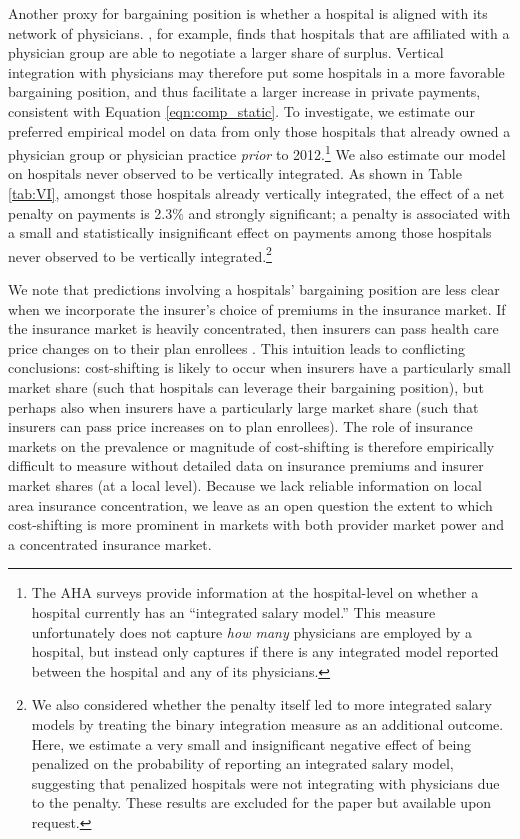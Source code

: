 \documentclass[12pt]{article}
\begin{document}
Another proxy for bargaining position is whether a hospital is aligned with its network of physicians. \cite{lewis2015}, for example, finds that hospitals that are affiliated with a physician group are able to negotiate a larger share of surplus. Vertical integration with physicians may therefore put some hospitals in a more favorable bargaining position, and thus facilitate a larger increase in private payments, consistent with Equation \ref{eqn:comp_static}. To investigate, we estimate our preferred empirical model on data from only those hospitals that already owned a physician group or physician practice \textit{prior} to 2012.\footnote{The AHA surveys provide information at the hospital-level on whether a hospital currently has an ``integrated salary model.'' This measure unfortunately does not capture \textit{how many} physicians are employed by a hospital, but instead only captures if there is any integrated model reported between the hospital and any of its physicians.} We also estimate our model on hospitals never observed to be vertically integrated.  As shown in Table \ref{tab:VI}, amongst those hospitals already vertically integrated, the effect of a net penalty on payments is 2.3$\%$ and strongly significant; a penalty is associated with a small and statistically insignificant effect on payments among those hospitals never observed to be vertically integrated.\footnote{We also considered whether the penalty itself led to more integrated salary models by treating the binary integration measure as an additional outcome. Here, we estimate a very small and insignificant negative effect of being penalized on the probability of reporting an integrated salary model, suggesting that penalized hospitals were not integrating with physicians due to the penalty. These results are excluded for the paper but available upon request.}

We note that predictions involving a hospitals' bargaining position are less clear when we incorporate the insurer's choice of premiums in the insurance market. If the insurance market is heavily concentrated, then insurers can pass health care price changes on to their plan enrollees \citep{trish2015,ho2017}. This intuition leads to conflicting conclusions: cost-shifting is likely to occur when insurers have a particularly small market share (such that hospitals can leverage their bargaining position), but perhaps also when insurers have a particularly large market share (such that insurers can pass price increases on to plan enrollees). The role of insurance markets on the prevalence or magnitude of cost-shifting is therefore empirically difficult to measure without detailed data on insurance premiums and insurer market shares (at a local level). Because we lack reliable information on local area insurance concentration, we leave as an open question the extent to which cost-shifting is more prominent in markets with both provider market power and a concentrated insurance market.
\end{document}
